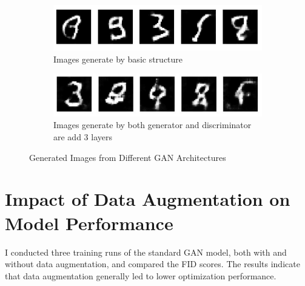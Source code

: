 \begin{figure}[H]
    \centering
    \begin{subfigure}[b]{\linewidth}
        \centering
        \includegraphics[width=0.7\linewidth]{./Images/generate_image_by_convolution_layer.jpg}
        \caption{Images generate by basic structure}
        \label{fig:Dense}
    \end{subfigure}
    \vspace{0.05\linewidth} 
    \begin{subfigure}[b]{\linewidth}
        \centering
        \includegraphics[width=0.7\linewidth]{./Images/both_generator_and_discrimminator_are_add_3_layers.jpg}
        \caption{Images generate by both generator and discriminator are add 3 layers}
        \label{fig:Conv2DTranspose}
    \end{subfigure}
    \caption{Generated Images from Different GAN Architectures}
    \label{fig:combined}
\end{figure}


\section{Impact of Data Augmentation on Model Performance}

I conducted three training runs of the standard GAN model, both with and without data augmentation, 
and compared the FID scores. The results indicate that data augmentation generally led to lower optimization performance.


